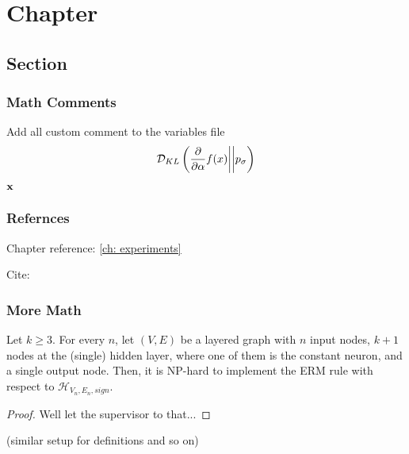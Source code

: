 \chapter{Chapter}
\section{Section}
\subsection{Math Comments}

Add all custom comment to the variables file
\begin{align}
{\mathcal{D}_{KL}}\left(\frac{\partial }{\partial \alpha}f(x) \middle|\middle| p_\sigma\right)
\end{align}

$\bf x$


\subsection{Refernces}

Chapter reference: \autoref{ch: experiments}

Cite: \cite{MNIST}


\subsection{More Math}

\begin{theorem}
	Let $k \geq 3$. For every $n$, let $(V,E)$ be a layered graph with $n$ input nodes, $k + 1$ nodes at the (single) hidden layer, where one of them is the constant neuron, and a single output node. Then, it is NP-hard to implement the ERM rule with respect to $\mathcal{H}_{V_n,E_n,sign}$.
\end{theorem}

\begin{proof}
	Well let the supervisor to that...
\end{proof}

(similar setup for definitions and so on)